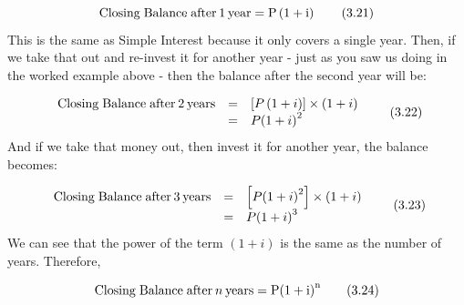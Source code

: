       \label{m39334*id72678}\nopagebreak\noindent{}
    \begin{equation}
    \mathrm{Closing\; Balance\; after}\phantom{\rule{2pt}{0ex}} 1 \phantom{\rule{2pt}{0ex}}\mathrm{year}=\mathrm{P}\left(1+\mathrm{i}\right)\tag{3.21}
      \end{equation}
      \label{m39334*id72719}This is the same as Simple Interest because it only covers a single year. Then, if we take that out and re-invest it for another year - just as you saw us doing in the worked example above - then the balance after the second year will be:\par 
      \label{m39334*id72727}\nopagebreak\noindent{}
    \begin{equation}
    \begin{array}{ccc}\hfill \mathrm{Closing\; Balance\; after}\phantom{\rule{2pt}{0ex}}2\phantom{\rule{2pt}{0ex}}\mathrm{years}& =& \left[P\left(1+i\right)\right]\ensuremath{\times}\left(1+i\right)\hfill \\ & =& P{\left(1+i\right)}^{2}\hfill \end{array}\tag{3.22}
      \end{equation}
      \label{m39334*id72823}And if we take that money out, then invest it for another year, the balance becomes:\par 
      \label{m39334*id72827}\nopagebreak\noindent{}
    \begin{equation}
    \begin{array}{ccc}\hfill \mathrm{Closing\; Balance\; after}\phantom{\rule{2pt}{0ex}}3\phantom{\rule{2pt}{0ex}}\mathrm{years}& =& \left[P{\left(1+i\right)}^{2}\right]\ensuremath{\times}\left(1+i\right)\hfill \\ & =& P{\left(1+i\right)}^{3}\hfill \end{array}\tag{3.23}
      \end{equation}
      \label{m39334*id72931}We can see that the power of the term $\left(1+i\right)$ is the same as the number of years. Therefore,\par 
      \label{m39334*uid61}\nopagebreak\noindent{}
    \begin{equation}
    \mathrm{Closing\; Balance\; after}\phantom{\rule{2pt}{0ex}}n\phantom{\rule{2pt}{0ex}}\mathrm{years}=\mathrm{P}{\left(1+\mathrm{i}\right)}^{\mathrm{n}}\tag{3.24}
      \end{equation}
